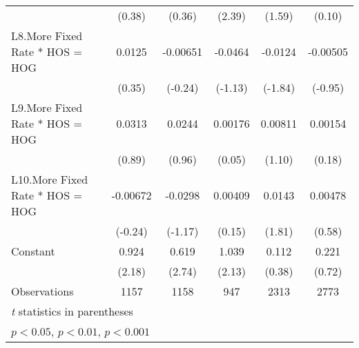 {\begin{longtable}{l*{5}{c}}
                &   (0.38)         &   (0.36)         &   (2.39)         &   (1.59)         &   (0.10)         \\
\addlinespace
L8.More Fixed Rate * HOS = HOG&   0.0125         & -0.00651         &  -0.0464         &  -0.0124         & -0.00505         \\
                &   (0.35)         &  (-0.24)         &  (-1.13)         &  (-1.84)         &  (-0.95)         \\
\addlinespace
L9.More Fixed Rate * HOS = HOG&   0.0313         &   0.0244         &  0.00176         &  0.00811         &  0.00154         \\
                &   (0.89)         &   (0.96)         &   (0.05)         &   (1.10)         &   (0.18)         \\
\addlinespace
L10.More Fixed Rate * HOS = HOG& -0.00672         &  -0.0298         &  0.00409         &   0.0143         &  0.00478         \\
                &  (-0.24)         &  (-1.17)         &   (0.15)         &   (1.81)         &   (0.58)         \\
\addlinespace
Constant        &    0.924\sym{*}  &    0.619\sym{**} &    1.039\sym{*}  &    0.112         &    0.221         \\
                &   (2.18)         &   (2.74)         &   (2.13)         &   (0.38)         &   (0.72)         \\
\midrule
Observations    &     1157         &     1158         &      947         &     2313         &     2773         \\
\bottomrule
\multicolumn{6}{l}{\footnotesize \textit{t} statistics in parentheses}\\
\multicolumn{6}{l}{\footnotesize \sym{*} \(p<0.05\), \sym{**} \(p<0.01\), \sym{***} \(p<0.001\)}\\
\end{longtable}
}

